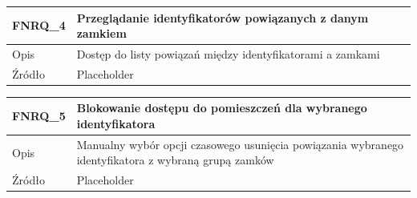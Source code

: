\begin{table}[h!]
\begin{subtable}[c]{\textwidth}
\begin{tabular}{|p{2cm}|p{10cm}|}
                \end{tabular}
                \label{tbl:fnrq3}
                \vspace{10mm}           
            \end{subtable}
        \quad%
            \begin{subtable}[c]{\textwidth}
                \centering
                 \begin{tabular}{|p{2cm}|p{10cm}|}
                    \hline FNRQ\_4      & Przeglądanie identyfikatorów powiązanych z danym zamkiem  \\
                    \hline Opis         & Dostęp do listy powiązań między identyfikatorami a zamkami \\
                    \hline Źródło       & Placeholder    \\
                    \hline
                \end{tabular}
                \label{tbl:fnrq4}
                \vspace{10mm}           
            \end{subtable}
        \quad%
            \begin{subtable}[c]{\textwidth}
                \centering
                 \begin{tabular}{|p{2cm}|p{10cm}|}
                    \hline FNRQ\_5      & Blokowanie dostępu do pomieszczeń dla wybranego identyfikatora  \\
                    \hline Opis         & Manualny wybór opcji czasowego usunięcia powiązania wybranego identyfikatora z wybraną grupą zamków \\
                    \hline Źródło       & Placeholder    \\
                    \hline
                \end{tabular}
                \label{tbl:fnrq5}
                \vspace{10mm}           
            \end{subtable}
        \label{tbl:fnrq}
        \end{table}

        \pagebreak


